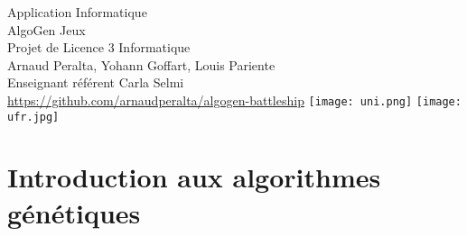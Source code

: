 \documentclass[12pt]{report}
\begin{document}
\begin{titlepage}
    \centering
    \hspace{0pt}
    \vfill
    {\LARGE Application Informatique\\AlgoGen Jeux\\}
    \vspace{0.5cm}
    {\LARGE Projet de Licence 3 Informatique}
    \vspace{1cm}
    {\large \\Arnaud Peralta, Yohann Goffart, Louis Pariente}
    \vspace{0.05cm}
    {\large \\Enseignant référent Carla Selmi\\}
    \vspace{3cm}
    {\large \href{https://github.com/arnaudperalta/algogen-battleship}{https://github.com/arnaudperalta/algogen-battleship}}
    \vfill
    \texttt{[image: uni.png]}
    \hspace{2 cm}
    \texttt{[image: ufr.jpg]}
\end{titlepage}
\renewcommand{\contentsname}{Sommaire}
\doublespacing
\tableofcontents
\newpage
{}

\section{Introduction aux algorithmes génétiques}
\end{document}
